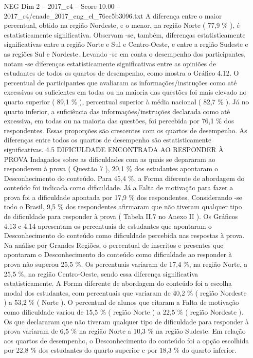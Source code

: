 \begin{textsample}{NEG Dim 2 – 2017\_c4 – Score 10.00 – 2017\_c4/enade\_2017\_eng\_el\_76ec5b3096.txt}
A diferença entre o maior percentual, obtido na região Nordeste, e o menor, na região Norte ( 77,9 \% ), é estatisticamente significativa.
Observam -se, também, diferenças estatisticamente significativas entre a região Norte e Sul e Centro-Oeste, e entre a região Sudeste e as regiões Sul e Nordeste.
Levando -se em conta o desempenho dos participantes, notam -se diferenças estatisticamente significativas entre as opiniões de estudantes de todos os quartos de desempenho, como mostra o Gráfico 4.12.
O percentual de participantes que avaliaram as informações/instruções como até excessivas ou suficientes em todas ou na maioria das questões foi mais elevado no quarto superior ( 89,1 \% ), percentual superior à média nacional ( 82,7 \% ).
Já no quarto inferior, a suficiência das informações/instruções declarada como até excessiva, em todas ou na maioria das questões, foi percebida por 76,1 \% dos respondentes.
Essas proporções são crescentes com os quartos de desempenho.
As diferenças entre todos os quartos de desempenho são estatisticamente significativas. 4.5 DIFICULDADE ENCONTRADA AO RESPONDER À PROVA Indagados sobre as dificuldades com as quais se depararam ao responderem à prova ( Questão 7 ), 20,1 \% dos estudantes apontaram o Desconhecimento do conteúdo.
Para 45,4 \%, a Forma diferente de abordagem do conteúdo foi indicada como dificuldade.
Já a Falta de motivação para fazer a prova foi a dificuldade apontada por 17,9 \% dos respondentes.
Considerando -se todo o Brasil, 9,5 \% dos respondentes afirmaram que não tiveram qualquer tipo de dificuldade para responder à prova ( Tabela II.7 no Anexo II ).
Os Gráficos 4.13 e 4.14 apresentam os percentuais de estudantes que apontaram o Desconhecimento do conteúdo como dificuldade percebida nas respostas à prova.
Na análise por Grandes Regiões, o percentual de inscritos e presentes que apontaram o Desconhecimento do conteúdo como dificuldade ao responder à prova não superou 25,5 \%.
Os percentuais variaram de 17,4 \%, na região Norte, a 25,5 \%, na região Centro-Oeste, sendo essa diferença significativa estatisticamente.
A Forma diferente de abordagem do conteúdo foi a escolha modal dos estudantes, com percentuais que variaram de 40,2 \% ( região Nordeste ) a 53,2 \% ( Norte ).
O percentual de alunos que citaram a Falta de motivação como dificuldade variou de 15,5 \% ( região Norte ) a 22,5 \% ( região Nordeste ).
Os que declararam que não tiveram qualquer tipo de dificuldade para responder à prova variaram de 6,5 \% na região Norte a 10,3 \% na região Sudeste.
Em relação aos quartos de desempenho, o Desconhecimento do conteúdo foi a opção escolhida por 22,8 \% dos estudantes do quarto superior e por 18,3 \% do quarto inferior.

\end{textsample}
